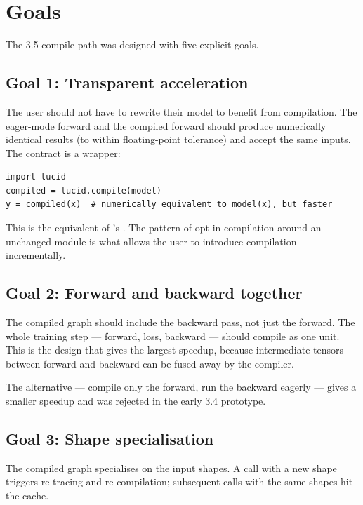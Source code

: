 \section{Goals}
\label{sec:compile_design:goals}

The 3.5 compile path was designed with five explicit goals.

\subsection{Goal 1: Transparent acceleration}
\label{ssec:compile_design:goal_transparent}

The user should not have to rewrite their model to benefit from
compilation. The eager-mode forward and the compiled forward
should produce numerically identical results (to within
floating-point tolerance) and accept the same inputs. The
contract is a wrapper:

\begin{lstlisting}[style=lucid,language=LucidPython]
import lucid
compiled = lucid.compile(model)
y = compiled(x)  # numerically equivalent to model(x), but faster
\end{lstlisting}

This is the equivalent of 's .
The pattern of opt-in compilation around an unchanged module is
what allows the user to introduce compilation incrementally.

\subsection{Goal 2: Forward and backward together}
\label{ssec:compile_design:goal_fwd_bwd}

The compiled graph should include the backward pass, not just
the forward. The whole training step --- forward, loss, backward
--- should compile as one unit. This is the design that gives the
largest speedup, because intermediate tensors between forward
and backward can be fused away by the compiler.

The alternative --- compile only the forward, run the backward
eagerly --- gives a smaller speedup and was rejected in the early
3.4 prototype.

\subsection{Goal 3: Shape specialisation}
\label{ssec:compile_design:goal_shape}

The compiled graph specialises on the input shapes. A call with
a new shape triggers re-tracing and re-compilation; subsequent
calls with the same shapes hit the cache.

